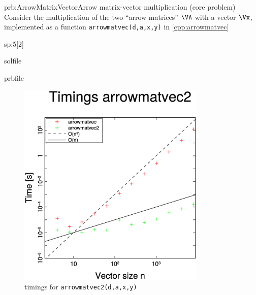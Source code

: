\begin{samproblem}{prb:ArrowMatrixVector}{Arrow matrix-vector multiplication (core problem)}{
Consider the multiplication of the two ``arrow matrices'' $\VA$ with a vector $\Vx$,
implemented as a function \texttt{arrowmatvec(d,a,x,y)} in \cref{cpp:arrowmatvec}
}
\begin{subproblem}{sp:5}[2]
\begin{samwriteprbpart}{solfile}
\begin{writeverbatim}{prbfile}
\begin{samsolution}
      \begin{figure}[ht]
        \centering
        \includegraphics[width=0.8\textwidth]{Chapters/MatrixVector/PICTURES/arrowmatvec2timing.eps}
        \caption{timings for \texttt{arrowmatvec2(d,a,x,y)}} \label{fig:arrowmatvec2timing}
      \end{figure}
      \end{samsolution}
    \end{writeverbatim}
  \end{samwriteprbpart}

\end{subproblem}


%
%
%
%
%

\end{samproblem}
